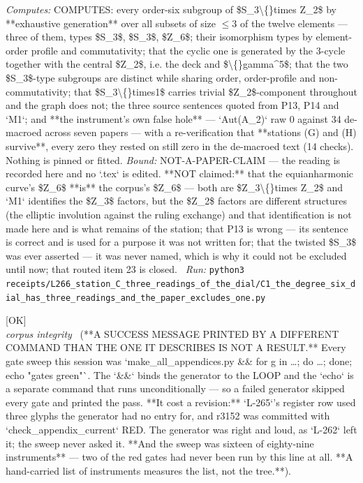 \begin{description}
\emph{Computes:} COMPUTES: every order-six subgroup of \$S\_3\textbackslash\{\}times Z\_2\$ by **exhaustive generation** over all subsets of size \ensuremath{\le}3 of the twelve elements --- three of them, types \$S\_3\$, \$S\_3\$, \$Z\_6\$; their isomorphism types by element-order profile and commutativity; that the cyclic one is generated by the 3-cycle together with the central \$Z\_2\$, i.e. the deck and \$\textbackslash\{\}gamma\textasciicircum{}5\$; that the two \$S\_3\$-type subgroups are distinct while sharing order, order-profile and non-commutativity; that \$S\_3\textbackslash\{\}times1\$ carries trivial \$Z\_2\$-component throughout and the graph does not; the three source sentences quoted from P13, P14 and `M1`; and **the instrument's own false hole** --- `Aut(A\_2)` raw 0 against 34 de-macroed across seven papers --- with a re-verification that **stations (G) and (H) survive**, every zero they rested on still zero in the de-macroed text (14 checks). Nothing is pinned or fitted.
 \emph{Bound:} NOT-A-PAPER-CLAIM --- the reading is recorded here and no `.tex` is edited. **NOT claimed:** that the equianharmonic curve's \$Z\_6\$ **is** the corpus's \$Z\_6\$ --- both are \$Z\_3\textbackslash\{\}times Z\_2\$ and `M1` identifies the \$Z\_3\$ factors, but the \$Z\_2\$ factors are different structures (the elliptic involution against the ruling exchange) and that identification is not made here and is what remains of the station; that P13 is wrong --- its sentence is correct and is used for a purpose it was not written for; that the twisted \$S\_3\$ was ever asserted --- it was never named, which is why it could not be excluded until now; that routed item 23 is closed.
\ \emph{Run:} \texttt{python3 receipts/L266\_station\_C\_three\_readings\_of\_the\_dial/C1\_the\_degree\_six\_dial\_has\_three\_readings\_and\_the\_paper\_excludes\_one.py}
\item[\label{rcpt:G1_a_success_message_printed_by_a_different_command_than_the_one_it_describes}\texttt{G1\_a\_success\_message\_printed\_by\_a\_different\_command\_than\_the\_one\_it\_describes}]\hfill\textsf{[OK]}\\
\textit{corpus integrity} \ (**A SUCCESS MESSAGE PRINTED BY A DIFFERENT COMMAND THAN THE ONE IT DESCRIBES IS NOT A RESULT.** Every gate sweep this session was `make\_all\_appendices.py \&\& for g in \ldots{}; do \ldots{}; done; echo "gates green"`. The `\&\&` binds the generator to the LOOP and the `echo` is a separate command that runs unconditionally --- so a failed generator skipped every gate and printed the pass. **It cost a revision:** `L-265`'s register row used three glyphs the generator had no entry for, and r3152 was committed with `check\_appendix\_current` RED. The generator was right and loud, as `L-262` left it; the sweep never asked it. **And the sweep was sixteen of eighty-nine instruments** --- two of the red gates had never been run by this line at all. **A hand-carried list of instruments measures the list, not the tree.**). 

\end{description}
